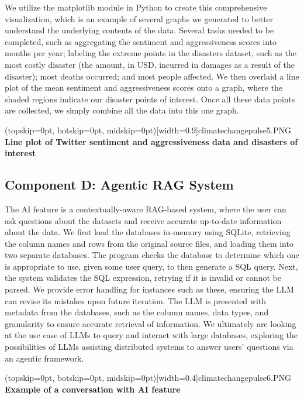 \documentclass{ieeeaccess}
\begin{document}
We utilize the matplotlib module in Python to create this comprehensive visualization, which is an example of several graphs we generated to better understand the underlying contents of the data. Several tasks needed to be completed, such as aggregating the sentiment and aggressiveness scores into months per year; labeling the extreme points in the disasters dataset, such as the most costly disaster (the amount, in USD, incurred in damages as a result of the disaster); most deaths occurred; and most people affected. We then overlaid a line plot of the mean sentiment and aggressiveness scores onto a graph, where the shaded regions indicate our disaster points of interest. Once all these data points are collected, we simply combine all the data into this one graph.

\Figure[t!](topskip=0pt, botskip=0pt, midskip=0pt)[width=0.9\columnwidth]{climatechangepulse5.PNG}
{ \textbf{Line plot of Twitter sentiment and aggressiveness data and disasters of interest}\label{fig4}}

\subsection{Component D: Agentic RAG System}
The AI feature is a contextually-aware RAG-based system, where the user can ask questions about the datasets and receive accurate up-to-date information about the data. We first load the databases in-memory using SQLite, retrieving the column names and rows from the original source files, and loading them into two separate databases. The program checks the database to determine which one is appropriate to use, given some user query, to then generate a SQL query. Next, the system validates the SQL expression, retrying if it is invalid or cannot be parsed. We provide error handling for instances such as these, ensuring the LLM can revise its mistakes upon future iteration. The LLM is presented with metadata from the databases, such as the column names, data types, and granularity to ensure accurate retrieval of information. We ultimately are looking at the use case of LLMs to query and interact with large databases, exploring the possibilities of LLMs assisting distributed systems to answer users' questions via an agentic framework.

\Figure[t!](topskip=0pt, botskip=0pt, midskip=0pt)[width=0.4\columnwidth]{climatechangepulse6.PNG}
{ \textbf{Example of a conversation with AI feature}\label{fig5}}
\end{document}
